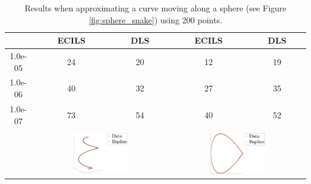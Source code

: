 {\begin{table}
\begin{tabular}{||c||c c || c c ||}
 & ECILS& DLS & ECILS & DLS\\
 \hline
1.0e-05 & 24	& 20 & 12 & 19\\
1.0e-06 & 40	& 32 & 27 & 35\\
1.0e-07 & 73	& 54 & 40 & 52 \\
\hline
&\multicolumn{2}{c||}{}&\multicolumn{2}{c||}{}\\
&\multicolumn{2}{c||}{\includegraphics[width=0.42\textwidth]{snake-crop}}
&\multicolumn{2}{c||}{\includegraphics[width=0.42\textwidth]{naca27-crop} }\\
\hline
\end{tabular}
\caption{Results when approximating a curve moving along a sphere (see Figure \ref{fig:sphere_snake}) using 200 points.}
 \end{table}

 
 
}
